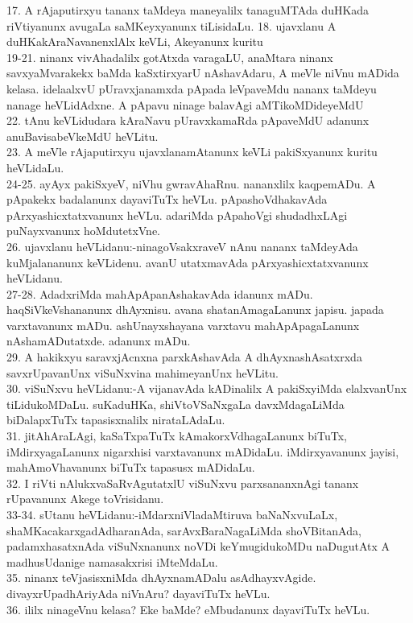 \documentclass{article}
\begin{document}
17. A rAjaputirxyu tananx taMdeya maneyalilx tanaguMTAda duHKada riVtiyanunx avugaLa saMKeyxyanunx tiLisidaLu.
18. ujavxlanu A duHKakAraNavanenxlAlx keVLi, Akeyanunx kuritu\\
19-21. ninanx vivAhadalilx gotAtxda varagaLU, anaMtara ninanx savxyaMvarakekx baMda kaSxtirxyarU nAshavAdaru, A meVle niVnu mADida kelasa. idelaalxvU pUravxjanamxda pApada leVpaveMdu nananx taMdeyu nanage heVLidAdxne. A pApavu ninage balavAgi aMTikoMDideyeMdU\\
22. tAnu keVLidudara kAraNavu pUravxkamaRda pApaveMdU adanunx anuBavisabeVkeMdU heVLitu.\\
23. A meVle rAjaputirxyu ujavxlanamAtanunx keVLi pakiSxyanunx kuritu heVLidaLu.\\
24-25. ayAyx pakiSxyeV, niVhu gwravAhaRnu. nananxlilx kaqpemADu. A pApakekx badalanunx dayaviTuTx heVLu. pApashoVdhakavAda pArxyashicxtatxvanunx heVLu. adariMda pApahoVgi shudadhxLAgi puNayxvanunx hoMdutetxVne.\\
26. ujavxlanu heVLidanu:-ninagoVsakxraveV nAnu nananx taMdeyAda kuMjalananunx keVLidenu. avanU utatxmavAda pArxyashicxtatxvanunx heVLidanu.\\
27-28. AdadxriMda mahApApanAshakavAda idanunx mADu. haqSiVkeVshananunx dhAyxnisu. avana shatanAmagaLanunx japisu. japada varxtavanunx mADu. ashUnayxshayana varxtavu mahApApagaLanunx nAshamADutatxde. adanunx mADu.\\
29. A hakikxyu saravxjAcnxna parxkAshavAda A dhAyxnashAsatxrxda savxrUpavanUnx viSuNxvina mahimeyanUnx heVLitu.\\
30. viSuNxvu heVLidanu:-A vijanavAda kADinalilx A pakiSxyiMda elalxvanUnx tiLidukoMDaLu. suKaduHKa, shiVtoVSaNxgaLa davxMdagaLiMda biDalapxTuTx tapasisxnalilx nirataLAdaLu.\\
31. jitAhAraLAgi, kaSaTxpaTuTx kAmakorxVdhagaLanunx biTuTx, iMdirxyagaLanunx nigarxhisi varxtavanunx mADidaLu. iMdirxyavanunx jayisi, mahAmoVhavanunx biTuTx tapasusx mADidaLu.\\
32. I riVti nAlukxvaSaRvAgutatxlU viSuNxvu parxsananxnAgi tananx rUpavanunx Akege toVrisidanu.\\
33-34. sUtanu heVLidanu:-iMdarxniVladaMtiruva baNaNxvuLaLx, shaMKacakarxgadAdharanAda, sarAvxBaraNagaLiMda shoVBitanAda, padamxhasatxnAda viSuNxnanunx noVDi keYmugidukoMDu naDugutAtx A madhusUdanige namasakxrisi iMteMdaLu.\\
35. ninanx teVjasisxniMda dhAyxnamADalu asAdhayxvAgide. divayxrUpadhAriyAda niVnAru? dayaviTuTx heVLu.\\
36. ililx ninageVnu kelasa? Eke baMde? eMbudanunx dayaviTuTx heVLu.\\
\end{document}
